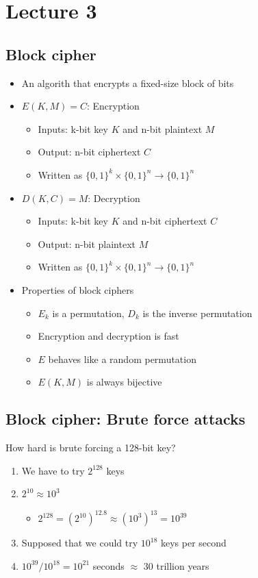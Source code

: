 \documentclass[12pt,a4paper]{article}
\begin{document}
\section{Lecture 3}
\subsection{Block cipher}
\begin{itemize}
    \item An algorith that encrypts a fixed-size block of bits
    \item $E(K,M) = C$: Encryption
    \begin{itemize}
        \item Inputs: k-bit key $K$ and n-bit plaintext $M$
        \item Output: n-bit ciphertext $C$
        \item Written as $\{0,1\}^k \times \{0,1\}^n \rightarrow \{0,1\}^n$
    \end{itemize}
    \item $D(K,C) = M$: Decryption
    \begin{itemize}
        \item Inputs: k-bit key $K$ and n-bit ciphertext $C$
        \item Output: n-bit plaintext $M$
        \item Written as $\{0,1\}^k \times \{0,1\}^n \rightarrow \{0,1\}^n$
    \end{itemize}
    \item Properties of block ciphers
    \begin{itemize}
        \item $E_k$ is a permutation, $D_k$ is the inverse permutation
        \item Encryption and decryption is fast
        \item $E$ behaves like a random permutation
        \item $E(K,M)$ is always bijective 
    \end{itemize}
\end{itemize}

\subsection{Block cipher: Brute force attacks}
How hard is brute forcing a 128-bit key?
\begin{enumerate}
    \item We have to try $2^{128}$ keys
    \item $2^10 \approx 10^3$
    \begin{itemize}
        \item $2^{128} = (2^{10})^{12.8} \approx (10^3)^{13} = 10^{39}$ 
    \end{itemize}
    \item Supposed that we could try $10^{18}$ keys per second
    \item $10^{39} / 10^{18} = 10^{21}$ seconds $\approx$ 30 trillion years
\end{enumerate}
\newpage
\end{document}
